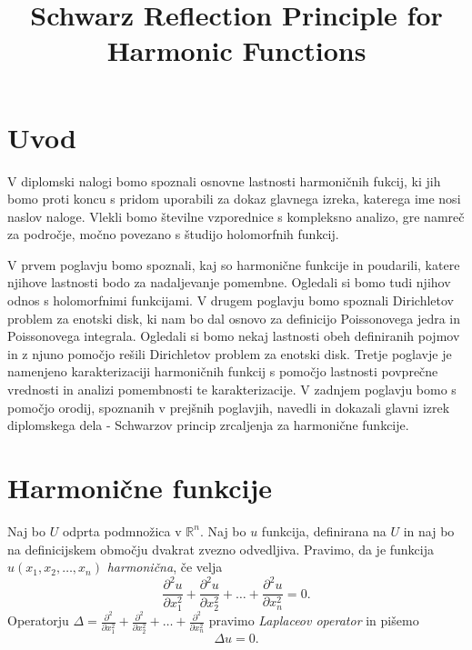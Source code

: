 \documentclass[mat1]{fmfdelo}
\title{Schwarz Reflection Principle for Harmonic Functions}
\begin{document}
\section{Uvod}
V diplomski nalogi bomo spoznali osnovne lastnosti harmoničnih fukcij, ki jih bomo proti koncu s pridom uporabili za dokaz glavnega izreka, katerega ime nosi naslov naloge.
Vlekli bomo številne vzporednice s kompleksno analizo, gre namreč za področje, močno povezano s študijo holomorfnih funkcij.

V prvem poglavju bomo spoznali, kaj so harmonične funkcije in poudarili, katere njihove lastnosti bodo za nadaljevanje pomembne. Ogledali si bomo tudi njihov odnos s holomorfnimi funkcijami. 
V drugem poglavju bomo spoznali Dirichletov problem za enotski disk, ki nam bo dal osnovo za definicijo Poissonovega jedra in Poissonovega integrala. Ogledali si bomo nekaj lastnosti obeh definiranih pojmov in z njuno pomočjo rešili Dirichletov problem za enotski disk.
Tretje poglavje je namenjeno karakterizaciji harmoničnih funkcij s pomočjo lastnosti povprečne vrednosti in analizi pomembnosti te karakterizacije. 
V zadnjem poglavju bomo s pomočjo orodij, spoznanih v prejšnih poglavjih, navedli in dokazali glavni izrek diplomskega dela - Schwarzov princip zrcaljenja za harmonične funkcije.
%

\newpage
\section{Harmonične funkcije}
    \begin{definicija}
        \label{harm}
        Naj bo $U$ odprta podmnožica v $\mathbb{R}^n$. Naj bo $u$ funkcija, definirana na $U$ in naj bo na definicijskem območju dvakrat zvezno odvedljiva.  
        Pravimo, da je funkcija $u(x_1, x_2, \dots, x_n)$ \emph{harmonična}, če velja
        $$
        \frac{\partial^2 u}{\partial x_1 ^ 2} +  \frac{\partial^2 u}{\partial x_2 ^ 2} + \dots + \frac{\partial^2 u}{\partial x_n ^ 2} = 0.
        $$
        Operatorju $\Delta  = \frac{\partial^2}{\partial x_1 ^ 2} +  \frac{\partial^2}{\partial x_2 ^ 2} + \dots + \frac{\partial^2}{\partial x_n ^ 2}$ pravimo \emph{Laplaceov operator} in pišemo
        $$
        \Delta u = 0.
        $$
    \end{definicija}
\end{document}
